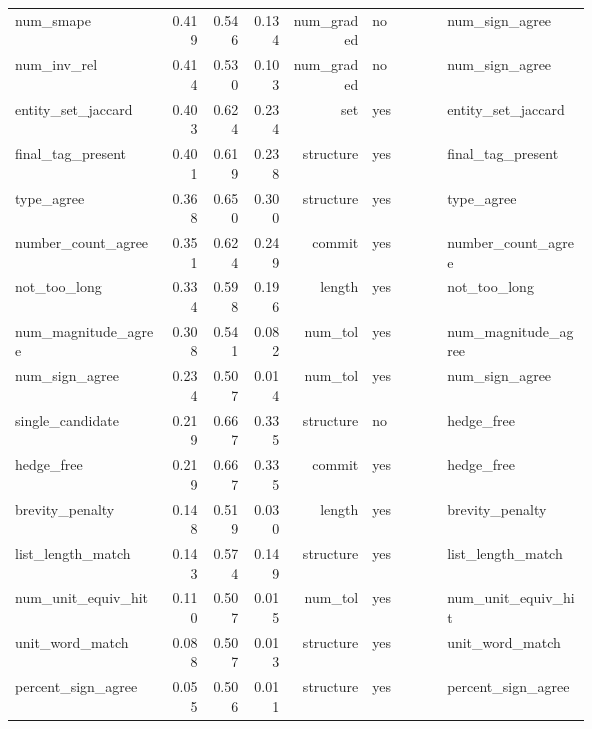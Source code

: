 \begin{longtable}{p{0.278\linewidth}rrrrp{0.134\linewidth}p{0.259\linewidth}}
num\_\allowbreak{}smape & 0.419 & 0.546 & 0.134 & num\_\allowbreak{}graded & no & num\_\allowbreak{}sign\_\allowbreak{}agree \\
num\_\allowbreak{}inv\_\allowbreak{}rel & 0.414 & 0.530 & 0.103 & num\_\allowbreak{}graded & no & num\_\allowbreak{}sign\_\allowbreak{}agree \\
entity\_\allowbreak{}set\_\allowbreak{}jaccard & 0.403 & 0.624 & 0.234 & set & yes & entity\_\allowbreak{}set\_\allowbreak{}jaccard \\
final\_\allowbreak{}tag\_\allowbreak{}present & 0.401 & 0.619 & 0.238 & structure & yes & final\_\allowbreak{}tag\_\allowbreak{}present \\
type\_\allowbreak{}agree & 0.368 & 0.650 & 0.300 & structure & yes & type\_\allowbreak{}agree \\
number\_\allowbreak{}count\_\allowbreak{}agree & 0.351 & 0.624 & 0.249 & commit & yes & number\_\allowbreak{}count\_\allowbreak{}agree \\
not\_\allowbreak{}too\_\allowbreak{}long & 0.334 & 0.598 & 0.196 & length & yes & not\_\allowbreak{}too\_\allowbreak{}long \\
num\_\allowbreak{}magnitude\_\allowbreak{}agree & 0.308 & 0.541 & 0.082 & num\_\allowbreak{}tol & yes & num\_\allowbreak{}magnitude\_\allowbreak{}agree \\
num\_\allowbreak{}sign\_\allowbreak{}agree & 0.234 & 0.507 & 0.014 & num\_\allowbreak{}tol & yes & num\_\allowbreak{}sign\_\allowbreak{}agree \\
single\_\allowbreak{}candidate & 0.219 & 0.667 & 0.335 & structure & no & hedge\_\allowbreak{}free \\
hedge\_\allowbreak{}free & 0.219 & 0.667 & 0.335 & commit & yes & hedge\_\allowbreak{}free \\
brevity\_\allowbreak{}penalty & 0.148 & 0.519 & 0.030 & length & yes & brevity\_\allowbreak{}penalty \\
list\_\allowbreak{}length\_\allowbreak{}match & 0.143 & 0.574 & 0.149 & structure & yes & list\_\allowbreak{}length\_\allowbreak{}match \\
num\_\allowbreak{}unit\_\allowbreak{}equiv\_\allowbreak{}hit & 0.110 & 0.507 & 0.015 & num\_\allowbreak{}tol & yes & num\_\allowbreak{}unit\_\allowbreak{}equiv\_\allowbreak{}hit \\
unit\_\allowbreak{}word\_\allowbreak{}match & 0.088 & 0.507 & 0.013 & structure & yes & unit\_\allowbreak{}word\_\allowbreak{}match \\
percent\_\allowbreak{}sign\_\allowbreak{}agree & 0.055 & 0.506 & 0.011 & structure & yes & percent\_\allowbreak{}sign\_\allowbreak{}agree \\

\end{longtable}
